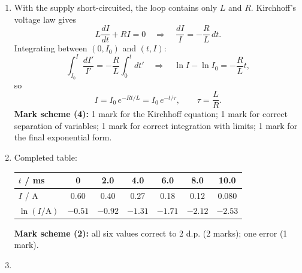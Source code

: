 \documentclass[11pt]{article}
\begin{document}
\begin{corrige}
\begin{enumerate}
\item[(a)] With the supply short-circuited, the loop contains only $L$ and $R$. Kirchhoff's voltage law gives
\[ L\frac{dI}{dt} + RI = 0 \quad\Longrightarrow\quad \frac{dI}{I} = -\frac{R}{L}\,dt. \]
Integrating between $(0, I_0)$ and $(t, I)$:
\[ \int_{I_0}^{I}\frac{dI'}{I'} = -\frac{R}{L}\int_0^t dt' \quad\Longrightarrow\quad \ln I - \ln I_0 = -\frac{R}{L}t, \]
so
\[ I = I_0\,e^{-Rt/L} = I_0\,e^{-t/\tau}, \qquad \tau = \frac{L}{R}. \]
\textbf{Mark scheme (4):} 1 mark for the Kirchhoff equation; 1 mark for correct separation of variables; 1 mark for correct integration with limits; 1 mark for the final exponential form.
\item[(b)] Completed table:
\begin{center}
\begin{tabular}{|l|c|c|c|c|c|c|}
\hline
\rowcolor{popblueL} $t$ / ms & 0 & 2.0 & 4.0 & 6.0 & 8.0 & 10.0 \\
\hline
$I$ / A & 0.60 & 0.40 & 0.27 & 0.18 & 0.12 & 0.080 \\
\hline
$\ln(I/\mathrm{A})$ & $-0.51$ & $-0.92$ & $-1.31$ & $-1.71$ & $-2.12$ & $-2.53$ \\
\hline
\end{tabular}
\end{center}
\textbf{Mark scheme (2):} all six values correct to 2 d.p. (2 marks); one error (1 mark).
\item[(c)]
\begin{popfigure}
\begin{center}

\end{center}
\end{popfigure}
\end{enumerate}
\end{corrige}
\end{document}
